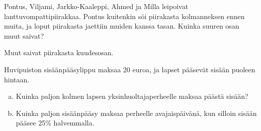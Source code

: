     
    \begin{tehtava} %
        Pontus, Viljami, Jarkko-Kaaleppi, Ahmed ja Milla leipoivat lanttuvompattipiirakkaa.
        Pontus kuitenkin söi piirakasta kolmanneksen ennen muita, ja loput piirakasta
        jaettiin muiden kanssa tasan. Kuinka suuren osan muut saivat?
        
        \begin{vastaus}
            Muut saivat piirakasta kuudesosan.
        \end{vastaus}
    \end{tehtava}
    
    \begin{tehtava} %
        Huvipuiston sisäänpääsylippu maksaa 20 euroa, ja lapset pääsevät
        sisään puoleen hintaan.
	\begin {enumerate}[a)]
		\item Kuinka paljon kolmen lapsen yksinhuoltajaperheelle maksaa päästä sisään?
		\item Kuinka paljon sisäänpääsy maksaa perheelle avajaispäivänä,
		kun silloin sisään pääsee 25\% halvemmalla.
        \end {enumerate}
    \end{tehtava}
    
